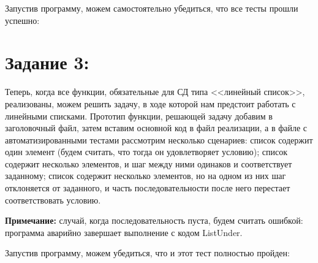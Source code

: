 \documentclass[12pt]{article}
\begin{document}
{	 
	
	Запустив программу, можем самостоятельно убедиться, что все тесты прошли успешно:
	
	\begin{figure}[bh]
		\noindent{}
	\end{figure}
	
	
	\section{Задание 3:}
	\label{task_3}
	
	Теперь, когда все функции, обязательные для СД типа <<линейный список>>, реализованы, можем решить задачу, в ходе которой нам предстоит работать с линейными списками. Прототип функции, решающей задачу добавим в заголовочный файл, затем вставим основной код в файл реализации, а в файле с автоматизированными тестами рассмотрим несколько сценариев: список содержит один элемент (будем считать, что тогда он удовлетворяет условию); список содержит несколько элементов, и шаг между ними одинаков и соответствует заданному; список содержит несколько элементов, но на одном из них шаг отклоняется от заданного, и часть последовательности после него перестает соответствовать условию.
	
	{\bf Примечание:} случай, когда последовательность пуста, будем считать ошибкой: программа аварийно завершает выполнение с кодом ListUnder.
	
	 
	
	 
	
	Запустив программу, можем убедиться, что и этот тест полностью пройден:
	
	\begin{figure}[bh]
		\noindent{}
	\end{figure}
	
}
\end{document}
